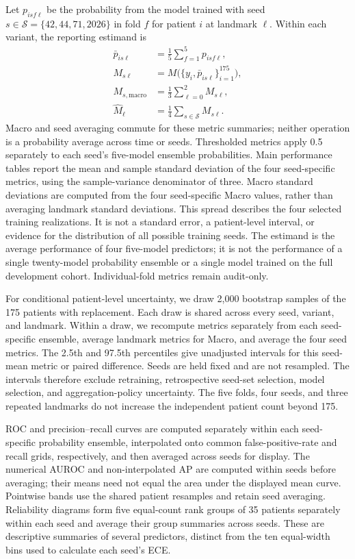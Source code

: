 Let $p_{isf\ell}$ be the probability from the model trained with seed $s\in\mathcal{S}=\{42,44,71,2026\}$ in fold $f$ for patient $i$ at landmark $\ell$. Within each variant, the reporting estimand is
\begin{equation}
\begin{aligned}
 \bar p_{is\ell}&=\frac{1}{5}\sum_{f=1}^{5}p_{isf\ell},\\
 M_{s\ell}&=M\bigl(\{y_i,\bar p_{is\ell}\}_{i=1}^{175}\bigr),\\
 M_{s,\mathrm{macro}}&=\frac{1}{3}\sum_{\ell=0}^{2}M_{s\ell},\\
 \widehat M_\ell&=\frac{1}{4}\sum_{s\in\mathcal{S}}M_{s\ell}.
\end{aligned}
\end{equation}
Macro and seed averaging commute for these metric summaries; neither operation is a probability average across time or seeds. Thresholded metrics apply 0.5 separately to each seed's five-model ensemble probabilities. Main performance tables report the mean and sample standard deviation of the four seed-specific metrics, using the sample-variance denominator of three. Macro standard deviations are computed from the four seed-specific Macro values, rather than averaging landmark standard deviations. This spread describes the four selected training realizations. It is not a standard error, a patient-level interval, or evidence for the distribution of all possible training seeds. The estimand is the average performance of four five-model predictors; it is not the performance of a single twenty-model probability ensemble or a single model trained on the full development cohort. Individual-fold metrics remain audit-only.

For conditional patient-level uncertainty, we draw 2,000 bootstrap samples of the 175 patients with replacement. Each draw is shared across every seed, variant, and landmark. Within a draw, we recompute metrics separately from each seed-specific ensemble, average landmark metrics for Macro, and average the four seed metrics. The 2.5th and 97.5th percentiles give unadjusted intervals for this seed-mean metric or paired difference. Seeds are held fixed and are not resampled. The intervals therefore exclude retraining, retrospective seed-set selection, model selection, and aggregation-policy uncertainty. The five folds, four seeds, and three repeated landmarks do not increase the independent patient count beyond 175.

ROC and precision--recall curves are computed separately within each seed-specific probability ensemble, interpolated onto common false-positive-rate and recall grids, respectively, and then averaged across seeds for display. The numerical AUROC and non-interpolated AP are computed within seeds before averaging; their means need not equal the area under the displayed mean curve. Pointwise bands use the shared patient resamples and retain seed averaging. Reliability diagrams form five equal-count rank groups of 35 patients separately within each seed and average their group summaries across seeds. These are descriptive summaries of several predictors, distinct from the ten equal-width bins used to calculate each seed's ECE.

